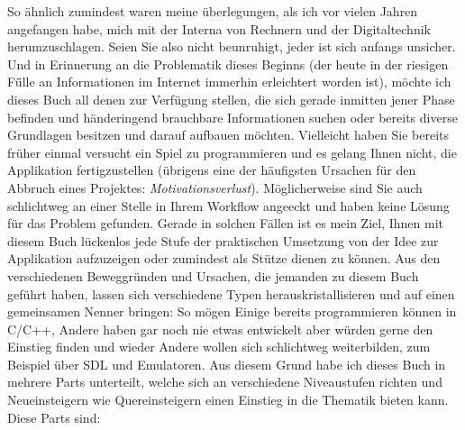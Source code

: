 \documentclass[b5paper,10pt,dvips,fleqn,titlepage,twoside]{book}
\begin{document}
So ähnlich zumindest waren meine \"{u}berlegungen, als ich vor vielen Jahren angefangen habe, mich mit der Interna von Rechnern und der Digitaltechnik herumzuschlagen. Seien Sie also nicht beunruhigt, jeder ist sich anfangs unsicher. Und in Erinnerung an die Problematik dieses Beginns (der heute in der riesigen F\"{ü}lle an Informationen im Internet immerhin erleichtert worden ist), m\"{o}chte ich dieses Buch all denen zur Verf\"{u}gung stellen, die sich gerade inmitten jener Phase befinden und händeringend brauchbare Informationen suchen oder bereits diverse Grundlagen besitzen und darauf aufbauen m\"{o}chten.\newline
Vielleicht haben Sie bereits früher einmal versucht ein Spiel zu programmieren und es gelang Ihnen nicht, die Applikation fertigzustellen (übrigens eine der häufigsten Ursachen für den Abbruch eines Projektes: \textit{Motivationsverlust}). Möglicherweise sind Sie auch schlichtweg an einer Stelle in Ihrem Workflow angeeckt und haben keine Lösung für das Problem gefunden.
Gerade in solchen Fällen ist es mein Ziel, Ihnen mit diesem Buch lückenlos jede Stufe der praktischen Umsetzung von der Idee zur Applikation aufzuzeigen oder zumindest als Stütze dienen zu können.
Aus den verschiedenen Beweggründen und Ursachen, die jemanden zu diesem Buch geführt haben, lassen sich verschiedene Typen herauskristallisieren und auf einen gemeinsamen Nenner bringen: So mögen Einige bereits programmieren können in C/C++, Andere haben gar noch nie etwas entwickelt aber würden gerne den Einstieg finden und wieder Andere wollen sich schlichtweg weiterbilden, zum Beispiel über SDL und Emulatoren. Aus diesem Grund habe ich dieses Buch in mehrere Parts unterteilt, welche sich an verschiedene Niveaustufen richten und Neueinsteigern wie Quereinsteigern einen Einstieg in die Thematik bieten kann. Diese Parts sind:
\newline
\end{document}
